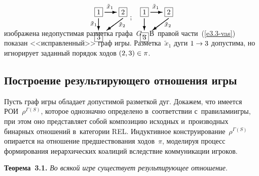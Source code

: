 \begin{multicols}{2}
    \vspace*{-29pt}
    
    \noindent
      \begin{equation} 
\setlength{\unitlength}{1mm}\thicklines %
\begin{picture}(16,20)
\put(2,2.5){$\boxed{1}$}
\put(7,3.5){\vector(1,0){6}}
\put(14,2.5){$\boxed{2}$}
\put(8,5.5){\small{$\tilde{x}_1$}}
\put(4,0.5){\vector(0,-1){6}}
\put(0,-3){\small{$\tilde{x}_1$}}
\put(14,-3.5){\small{$\tilde{x}_2$}}
\put(2,-10){$\boxed{3}$}
\put(16,0.5){\vector(-4,-3){8}}
\end{picture}\enskip \enskip ; \quad %
\setlength{\unitlength}{1mm}\thicklines %
\begin{picture}(16,20)
\put(0,2.5){$\boxed{1}$}
\put(5,3.5){\vector(1,0){6}}
\put(12,2.5){$\boxed{2}$}
\put(6,5.5){\small{$\tilde{x}_1$}}
\put(2,0.5){\vector(0,-1){6}}
\put(12,-3.5){\small{$\tilde{x}_2$}}
\put(0,-10){$\boxed{3}$}
\put(14,0.5){\vector(-4,-3){8}}
\end{picture}
\label{e3.3-vas}
\end{equation}

\vspace*{29pt}

\noindent
изображена 
не\-до\-пус\-ти\-мая раз\-мет\-ка графа~$G_\pi$. В~правой час\-ти~(\ref{e3.3-vas}) показан 
<<ис\-прав\-лен\-ный>> граф игры. 
  Разметка~$\tilde{x}_1$ дуги $1\hm\to 3$ допустима, но игнорирует заданный 
порядок ходов $(2,3)\hm\in \pi$. 

    \subsection*{Построение результирующего отношения игры}

    Пусть граф игры обладает до\-пус\-ти\-мой раз\-мет\-кой дуг. Докажем, что имеется 
РОИ~$\rho^{\Gamma(S)}$, которое однозначно 
определено в~соответствии с~правилами\linebreak игры, при этом оно пред\-став\-ля\-ет собой 
композицию исходных и~производных бинарных отношений в~категории REL. 
Индуктивное конструирование~$\rho^{\Gamma(S)}$ опирается на отношение 
\mbox{пред\-шест\-во\-ва\-ния} ходов~$\pi$, моделируя процесс формирования иерархических 
коалиций вслед\-ст\-вие коммуникации игроков.
    
    \smallskip
    
    \noindent
    \textbf{Теорема~3.1.} \textit{Во всякой игре существует ре\-зуль\-ти\-ру\-ющее 
отношение}. 
    

\end{multicols}
